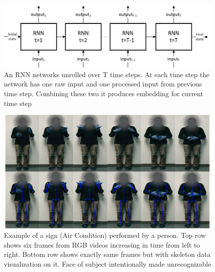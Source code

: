 \documentclass[10pt,twocolumn,letterpaper]{article}
\begin{document}
\begin{figure}[h]
	\begin{center}
		\includegraphics[width=\linewidth]{rnn_network}
	\end{center}
	\caption{An RNN networks unrolled over T time steps. At each time step the network has one raw input and one processed input from previous time step. Combining these two it produces embedding for current time step}
	\label{fig:rnn_network}
\end{figure}
\begin{figure}
	\begin{center}
		\includegraphics[width=.8\linewidth]{ac_person1_faceoff}
	\end{center}
	\caption{Example of a sign (Air Condition) performed by a person. Top row shows six frames from RGB videos increasing in time from left to right. Bottom row shows exactly same frames but with skeleton data visualization on it. Face of subject intentionally made unrecognizable}
	\label{fig:ac_person1}
\end{figure} 
\end{document}
